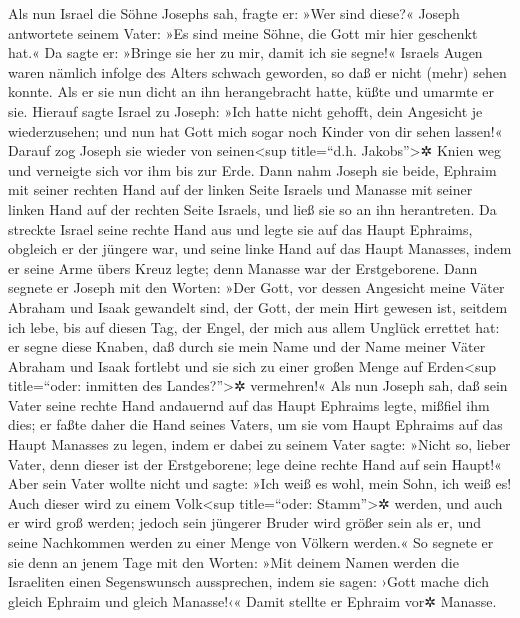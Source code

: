  Als nun Israel die Söhne Josephs sah, fragte er: »Wer
sind diese?«  Joseph antwortete seinem Vater: »Es sind
meine Söhne, die Gott mir hier geschenkt hat.« Da sagte er: »Bringe sie
her zu mir, damit ich sie segne!«  Israels Augen waren
nämlich infolge des Alters schwach geworden, so daß er nicht (mehr)
sehen konnte. Als er sie nun dicht an ihn herangebracht hatte, küßte und
umarmte er sie.  Hierauf sagte Israel zu Joseph: »Ich
hatte nicht gehofft, dein Angesicht je wiederzusehen; und nun hat Gott
mich sogar noch Kinder von dir sehen lassen!«  Darauf zog
Joseph sie wieder von seinen\textless sup title=``d.h.
Jakobs''\textgreater✲ Knien weg und verneigte sich vor ihm bis zur Erde.
 Dann nahm Joseph sie beide, Ephraim mit seiner rechten
Hand auf der linken Seite Israels und Manasse mit seiner linken Hand auf
der rechten Seite Israels, und ließ sie so an ihn herantreten.
 Da streckte Israel seine rechte Hand aus und legte sie
auf das Haupt Ephraims, obgleich er der jüngere war, und seine linke
Hand auf das Haupt Manasses, indem er seine Arme übers Kreuz legte; denn
Manasse war der Erstgeborene.  Dann segnete er Joseph mit
den Worten: »Der Gott, vor dessen Angesicht meine Väter Abraham und
Isaak gewandelt sind, der Gott, der mein Hirt gewesen ist, seitdem ich
lebe, bis auf diesen Tag,  der Engel, der mich aus allem
Unglück errettet hat: er segne diese Knaben, daß durch sie mein Name und
der Name meiner Väter Abraham und Isaak fortlebt und sie sich zu einer
großen Menge auf Erden\textless sup title=``oder: inmitten des
Landes?''\textgreater✲ vermehren!«  Als nun Joseph sah,
daß sein Vater seine rechte Hand andauernd auf das Haupt Ephraims legte,
mißfiel ihm dies; er faßte daher die Hand seines Vaters, um sie vom
Haupt Ephraims auf das Haupt Manasses zu legen,  indem er
dabei zu seinem Vater sagte: »Nicht so, lieber Vater, denn dieser ist
der Erstgeborene; lege deine rechte Hand auf sein Haupt!«
 Aber sein Vater wollte nicht und sagte: »Ich weiß es
wohl, mein Sohn, ich weiß es! Auch dieser wird zu einem
Volk\textless sup title=``oder: Stamm''\textgreater✲ werden, und auch er
wird groß werden; jedoch sein jüngerer Bruder wird größer sein als er,
und seine Nachkommen werden zu einer Menge von Völkern werden.«
 So segnete er sie denn an jenem Tage mit den Worten:
»Mit deinem Namen werden die Israeliten einen Segenswunsch aussprechen,
indem sie sagen: ›Gott mache dich gleich Ephraim und gleich Manasse!‹«
Damit stellte er Ephraim vor✲ Manasse.

